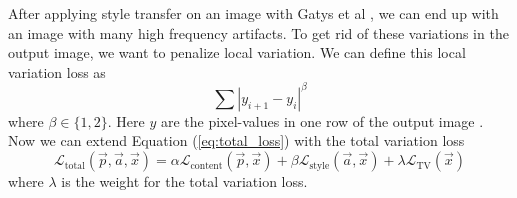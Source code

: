 \newline\newline
After applying style transfer on an image with Gatys et al \cite{Gatys:1}, we can end up with an image with many high frequency artifacts. To get rid of these variations in the output image, we want to penalize local variation. We can define this local variation loss as
\begin{equation}
    \sum{|y_{i+1}-y_i|^\beta}
\end{equation}
where $\beta\in\{1,2\}.$ Here $y$ are the pixel-values in one row of the output image \cite{Zhaoyou:1}. Now we can extend Equation (\ref{eq:total_loss}) with the total variation loss
\begin{equation}
    \mathcal{L}_\text{total}(\vec{p}, \vec{a}, \vec{x})=\alpha\mathcal{L}_\text{content}(\vec{p},\vec{x})+\beta\mathcal{L}_\text{style}(\vec{a},\vec{x})+\lambda\mathcal{L}_\text{TV}(\vec{x})
\end{equation}
where $\lambda$ is the weight for the total variation loss.
\newpage